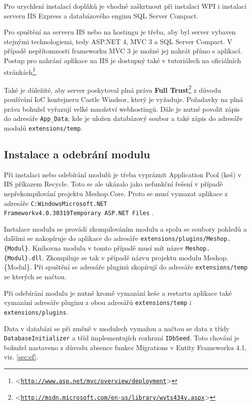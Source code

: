 \documentclass[11pt,twoside,a4paper]{book}
\let\oldUrl\url
\renewcommand\url[1]{<\texttt{\oldUrl{#1}}>}
\begin{document}
Pro urychlení instalací doplňků je vhodné zaškrtnout při instalaci WPI i instalaci serveru IIS Express a databázového enginu SQL Server Compact.

Pro spuštění na serveru IIS nebo na hostingu je třeba, aby byl server vybaven stejnými technologiemi, tedy ASP.NET 4, MVC 3 a SQL Server Compact. V případě nepřítomnosti frameworku MVC 3 je možné jej nahrát přímo s aplikací. Postup pro nahrání aplikace na IIS je dostupný také v tutoriálech na oficiálních stránkách\footnote{\url{http://www.asp.net/mvc/overview/deployment}}.

Také je důležité, aby server poskytoval plná práva \textbf{Full Trust}\footnote{\url{http://msdn.microsoft.com/en-us/library/wyts434y.aspx}} z důvodu používání IoC kontejneru Castle Windsor, který je vyžaduje. Požadavky na plná práva bohužel vyřazují velké množství webhostingů. Dále je nutné povolit zápis do adresáře \texttt{App\_Data}, kde je uložen databázový soubor a také zápis do adresáře modulů \texttt{extensions/temp}.



\subsection{Instalace a odebrání modulu}
Při instalaci nebo odebírání modulů je třeba vypráznit \textsf{Application Pool} (keš) v IIS příkazem \textsf{Recycle}. Toto se ale ukázalo jako nefunkční řešení v případě nepřekompilování projektu \textsf{Meshop.Core}. Proto se musí vymazat aplikace z adresáře \texttt{C:WindowsMicrosoft.NET\\Frameworkv4.0.30319Temporary ASP.NET Files} .

Instalace modulu se provádí zkompilováním modulu a spolu se soubory pohledů a dalšími se nakopíruje do aplikace do adresáře \texttt{extensions/plugins/Meshop.\{Modul\}}. Knihovna modulu v tomto případě musí mít název \texttt{Meshop.\{Modul\}.dll}. Zkompiluje se tak v případě názvu projektu modulu \textsf{Meshop.\{Modul\}}. Při spuštění se adresáře pluginů zkopírují do adresáře \texttt{extensions/temp} ze kterých se načtou.

Při odebírání modulu je nutné kromě vymazání keše a restartu aplikace také vymazání adresáře pluginu z obou adresářů \texttt{extensions/temp} i \texttt{extensions/plugins}.

Data v databázi se při změně v modulech vymažou a načtou se data z třídy \texttt{Database\-Initializer} a tříd implementujích rozhraní \texttt{IDbSeed}. Toto chování je bohužel nastaveno z důvodu absence funkce \textsf{Migrations} v Entity Frameworku 4.1, viz. \ref{sec:ef}.
\end{document}
